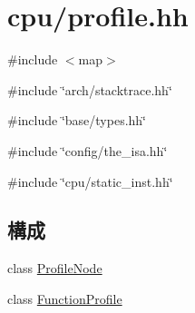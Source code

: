 \hypertarget{profile_8hh}{
\section{cpu/profile.hh}
\label{profile_8hh}
}
{\ttfamily \#include $<$map$>$}\par
{\ttfamily \#include \char`\"{}arch/stacktrace.hh\char`\"{}}\par
{\ttfamily \#include \char`\"{}base/types.hh\char`\"{}}\par
{\ttfamily \#include \char`\"{}config/the\_\-isa.hh\char`\"{}}\par
{\ttfamily \#include \char`\"{}cpu/static\_\-inst.hh\char`\"{}}\par
\subsection*{構成}
\begin{DoxyCompactItemize}
\item 
class \hyperlink{classProfileNode}{ProfileNode}
\item 
class \hyperlink{classFunctionProfile}{FunctionProfile}
\end{DoxyCompactItemize}
